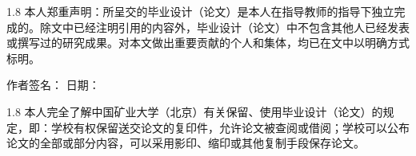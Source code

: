 \pagestyle{empty}

\vspace*{0.5cm} 

\begin{center}
\end{center}

\vspace{1cm}

\begin{spacing}{1.8}
    { \songti 本人郑重声明：所呈交的毕业设计（论文）是本人在指导教师的指导下独立完成的。除文中已经注明引用的内容外，毕业设计（论文）中不包含其他人已经发表或撰写过的研究成果。对本文做出重要贡献的个人和集体，均已在文中以明确方式标明。}
\end{spacing}

\vspace{0.8cm}

\begin{flushright}
    { \songti 作者签名：\underline{\hspace{3cm}} \quad 日期：\underline{\hspace{3cm}}}
\end{flushright}


\vspace{2.5cm}



\begin{center}
\end{center}

\vspace{1cm}

\begin{spacing}{1.8}
    { \songti 本人完全了解中国矿业大学（北京）有关保留、使用毕业设计（论文）的规定，即：学校有权保留送交论文的复印件，允许论文被查阅或借阅；学校可以公布论文的全部或部分内容，可以采用影印、缩印或其他复制手段保存论文。}
\end{spacing}

\vspace{1.2cm}

\clearpage